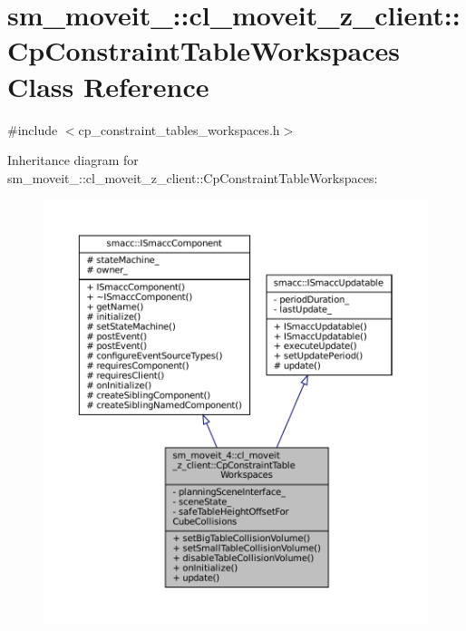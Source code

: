 \hypertarget{classsm__moveit__4_1_1cl__moveit__z__client_1_1CpConstraintTableWorkspaces}{}\section{sm\+\_\+moveit\+\_\+:\+:cl\+\_\+moveit\+\_\+z\+\_\+client\+:\+:Cp\+Constraint\+Table\+Workspaces Class Reference}
\label{classsm__moveit__4_1_1cl__moveit__z__client_1_1CpConstraintTableWorkspaces}


{\ttfamily \#include $<$cp\+\_\+constraint\+\_\+tables\+\_\+workspaces.\+h$>$}



Inheritance diagram for sm\+\_\+moveit\+\_\+:\+:cl\+\_\+moveit\+\_\+z\+\_\+client\+:\+:Cp\+Constraint\+Table\+Workspaces\+:
\nopagebreak
\begin{figure}[H]
\begin{center}
\leavevmode
\includegraphics[width=350pt]{classsm__moveit__4_1_1cl__moveit__z__client_1_1CpConstraintTableWorkspaces__inherit__graph}
\end{center}
\end{figure}


